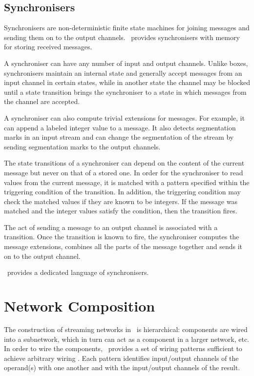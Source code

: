     \subsection*{Synchronisers}
Synchronisers are non-deterministic finite state machines for joining messages and sending them on to the output channels. \ak\ provides synchronisers with memory for storing received messages.

A synchroniser can have any number of input and output channels. Unlike boxes, synchronisers maintain an internal state and generally accept messages from an input channel in certain states, while in another state the channel may be blocked until a state transition brings the synchroniser to a state in which messages from the channel are accepted.

A synchroniser can also compute trivial extensions for messages. For example, it can append a labeled integer value to a message. It also detects segmentation marks in an input stream and can change the segmentation of the stream by sending segmentation marks to the output channels.

The state transitions of a synchroniser can depend on the content of the current message but never on that of a stored one. In order for the synchroniser to read values from the current message, it is matched with a pattern specified within the triggering condition of the transition. In addition, the triggering condition may check the matched values if they are known to be integers. If the message was matched and the integer values satisfy the condition, then the transition fires.

The act of sending a message to an output channel is associated with a transition. Once the transition is known to fire, the synchroniser computes the message extensions, combines all the parts of the message together and sends it on to the output channel.

\ak\ provides a dedicated language of synchronisers.


\section{Network Composition}
The construction of streaming networks in \ak\ is hierarchical: components are wired into a subnetwork, which in turn can act as a component in a larger network, etc. In order to wire the components, \ak\ provides a set of wiring patterns sufficient to achieve arbitrary wiring \cite{astrakahn}. Each pattern identifies input/output channels of the operand(s) with one another and with the input/output channels of the result.

